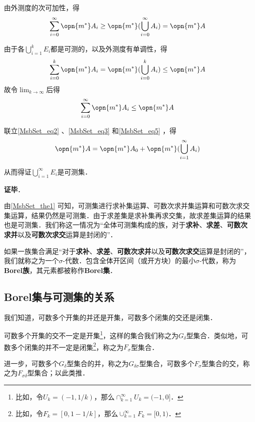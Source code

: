 由外测度的次可加性，得
\begin{equation}\label{MsbSet_eq3}
\sum_{i=0}^\infty\opn{m^*}A_i\geq \opn{m^*}(\bigcup_{i=0}^\infty A_i)=\opn{m^*}A
\end{equation}

由于各$\bigcup_{i=1}^k E_i$都是可测的，以及外测度有单调性，得
\begin{equation}
\sum_{i=0}^k\opn{m^*}A_i=\opn{m^*}(\bigcup_{i=0}^k A_i)\leq \opn{m^*}A
\end{equation}
故令$\lim_{k\to \infty}$后得
\begin{equation}\label{MsbSet_eq5}
\sum_{i=0}^\infty\opn{m^*}A_i\leq \opn{m^*}A
\end{equation}

联立\autoref{MsbSet_eq2} 、\autoref{MsbSet_eq3} 和\autoref{MsbSet_eq5} ，得
\begin{equation}
\opn{m^*}A=\opn{m^*}A_0+\opn{m^*}(\bigcup_{i=1}^\infty A_i)
\end{equation}

从而得证$\bigcup_{i=1}^\infty E_i$是可测集．




\textbf{证毕}．


由\autoref{MsbSet_the1} 可知，可测集进行求补集运算、可数次求并集运算和可数次求交集运算，结果仍然是可测集．由于求差集是求补集再求交集，故求差集运算的结果也是可测集．我们称这一情况为“全体可测集构成的族，对于\textbf{求补}、\textbf{求差}、\textbf{可数次求并}以及\textbf{可数次求交}运算是封闭的”．

\begin{definition}{}
如果一族集合满足“对于\textbf{求补}、\textbf{求差}、\textbf{可数次求并}以及\textbf{可数次求交}运算是封闭的”，我们就称之为一个$\sigma$-代数．包含全体开区间（或开方块）的最小$\sigma$-代数，称为\textbf{Borel族}，其元素都被称作\textbf{Borel集}．
\end{definition}


\subsection{Borel集与可测集的关系}

\begin{definition}{}

我们知道，可数多个开集的并还是开集，可数多个闭集的交还是闭集．

可数多个开集的交不一定是开集\footnote{比如，令$U_k=(-1, 1/k)$，那么$\cap_{k=1}^\infty U_k=(-1, 0]$．}，这样的集合我们称之为$G_\delta$型集合\cite{十一五实变函数论}．类似地，可数多个闭集的并不一定是闭集\footnote{比如，令$F_k=[0, 1-1/k]$，那么$\cup_{k=1}^\infty F_k=[0, 1)$．}，称之为$F_\sigma$型集合．

进一步，可数多个$G_\delta$型集合的并，称之为$G_{\delta\sigma}$型集合，可数多个$F_\sigma$型集合的交，称之为$F_{\sigma\delta}$型集合；以此类推．

\end{definition}

